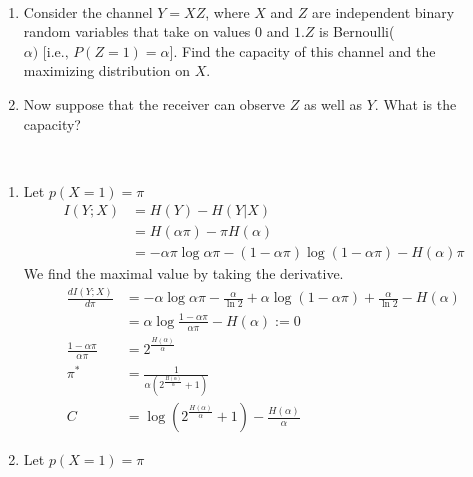 \begin{exercise}{\par{~}
  \begin{enumerate}
    \item Consider the channel $Y=X Z$, where $X$ and $Z$ are independent binary random variables that take on values 0 and $1 . Z$ is Bernoulli($\alpha \text {) [i.e., } P(Z=1)=\alpha] .$ Find the capacity of this channel and the maximizing distribution on $X$.
    \item Now suppose that the receiver can observe $Z$ as well as $Y$. What is the capacity?
  \end{enumerate} }
  \begin{solution}
  \par{~}
  \begin{enumerate}
    \item { Let $p(X=1)= \pi$
    \begin{equation}
      \begin{aligned}
        I(Y;X) &= H(Y) - H(Y|X) \\
        &= H(\alpha \pi) - \pi H(\alpha) \\
        &= - \alpha\pi \log \alpha\pi - (1 - \alpha\pi) \log (1- \alpha\pi) - H(\alpha)\pi
       \end{aligned}
    \end{equation}
    We find the maximal value by taking the derivative.
    \begin{equation}
      \begin{aligned}
        \frac{dI(Y;X)}{d\pi} &= - \alpha \log \alpha\pi - \frac{\alpha}{\ln 2} + \alpha \log (1-\alpha \pi) + \frac{\alpha}{\ln 2} - H(\alpha) \\
        &= \alpha \log \frac{1-\alpha\pi}{\alpha\pi} - H(\alpha) := 0 \\
        \frac{1-\alpha\pi}{\alpha\pi} &= 2^{\frac{H(\alpha)}{\alpha}} \\
        \pi^{*} &= \frac{1}{\alpha\left(2^{\frac{H(\alpha)}{\alpha}}+1\right)} \\
        C &= \log \left(2^{\frac{H(\alpha)}{\alpha}}+1\right)-\frac{H(\alpha)}{\alpha}
      \end{aligned}
    \end{equation}
    }
    \item { Let $p(X=1)= \pi$
}
\end{enumerate}
\end{solution}
\end{exercise}
